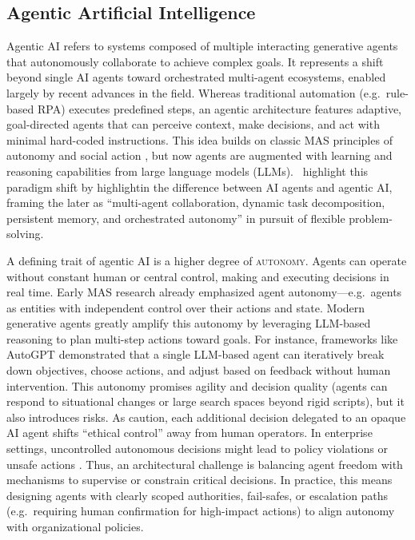 \subsection{Agentic Artificial Intelligence}\label{subsec:agentic-ai}
Agentic AI refers to systems composed of multiple interacting generative agents that autonomously collaborate to achieve complex goals. It represents a shift beyond single AI agents toward orchestrated multi-agent ecosystems, enabled largely by recent advances in the field. Whereas traditional automation (e.g.~rule-based RPA) executes predefined steps, an agentic architecture features adaptive, goal-directed agents that can perceive context, make decisions, and act with minimal hard-coded instructions. This idea builds on classic MAS principles of autonomy and social action \parencite{castelfranchiModelling1998,ferberMultiagent1999}, but now agents are augmented with learning and reasoning capabilities from large language models (LLMs).~\textcite{sapkotaAI2026} highlight this paradigm shift by highlightin the difference between AI agents and agentic AI, framing the later as “multi-agent collaboration, dynamic task decomposition, persistent memory, and orchestrated autonomy” in pursuit of flexible problem-solving.

A defining trait of agentic AI is a higher degree of \textsc{autonomy}. Agents can operate without constant human or central control, making and executing decisions in real time. Early MAS research already emphasized agent autonomy—e.g.~agents as entities with independent control over their actions and state. Modern generative agents greatly amplify this autonomy by leveraging LLM-based reasoning to plan multi-step actions toward goals. For instance, frameworks like AutoGPT \parencite{yangAutoGPT2023} demonstrated that a single LLM-based agent can iteratively break down objectives, choose actions, and adjust based on feedback without human intervention. This autonomy promises agility and decision quality (agents can respond to situational changes or large search spaces beyond rigid scripts), but it also introduces risks. As \textcite{russellResearch2015} caution, each additional decision delegated to an opaque AI agent shifts “ethical control” away from human operators. In enterprise settings, uncontrolled autonomous decisions might lead to policy violations or unsafe actions \parencite{gauravGovernance2025}. Thus, an architectural challenge is balancing agent freedom with mechanisms to supervise or constrain critical decisions. In practice, this means designing agents with clearly scoped authorities, fail-safes, or escalation paths (e.g.~requiring human confirmation for high-impact actions) to align autonomy with organizational policies.

